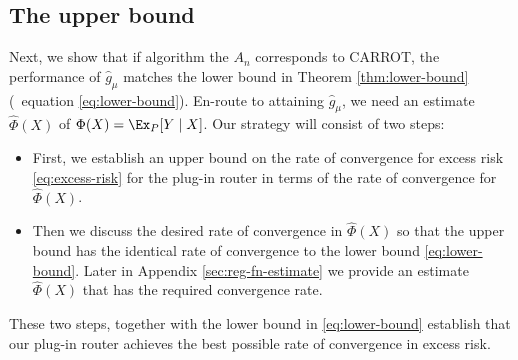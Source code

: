 \subsection{The upper bound }\label{sec:upper-bound}
Next, we show that if algorithm the $A_n$ corresponds to CARROT, the performance of $\hat{g}_{\mu}$ matches the lower bound in Theorem \ref{thm:lower-bound} (\cf\ equation \ref{eq:lower-bound}). En-route to attaining $\hat{g}_{\mu}$, we need an estimate $\hat \Phi(X)$ of $\Phi(X) = \Ex_P[Y \mid X ]$. %
Our strategy will consist of two steps: 
\begin{itemize}
    \item First,  we establish an upper bound on the rate of convergence for excess risk \eqref{eq:excess-risk} for the plug-in router in terms of the rate of convergence for $\hat \Phi(X)$. 
    \item Then we discuss the desired rate of convergence in $\hat \Phi(X)$ so that the upper bound has the identical rate of convergence to the lower bound \eqref{eq:lower-bound}. Later in Appendix \ref{sec:reg-fn-estimate} we provide an estimate $\hat \Phi(X)$ that has the required convergence rate. 
\end{itemize}
These two steps, together with the lower bound in \eqref{eq:lower-bound} establish that our plug-in router achieves the best possible rate of convergence in excess risk. 

